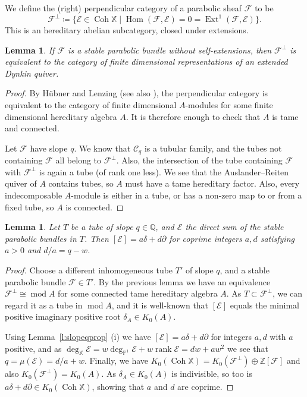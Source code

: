 \documentclass[12pt,a4paper]{amsart}
\theoremstyle{plain}
\newtheorem{lem}[thm]{Lemma}
\newcommand{\Q}{\mathbb Q}
\newcommand{\Z}{\mathbb Z}
\newcommand{\PP}{\mathbb P}
\DeclareMathOperator{\Coh}{Coh}
\DeclareMathOperator{\mmod}{mod}
\DeclareMathOperator{\Hom}{Hom}
\DeclareMathOperator{\Ext}{Ext}
\DeclareMathOperator{\rank}{rank}
\newcommand{\F}{\mathcal F}
\newcommand{\E}{\mathcal E}
\newcommand{\CC}{\mathcal C}
\newcommand{\XX}{\mathbb X}
\begin{document}
We define the (right) perpendicular category of a parabolic sheaf $\F$ to be
\[ \F^\perp \coloneqq \{\E\in\Coh\XX \mid \Hom(\F,\E) = 0 = \Ext^1(\F,\E)\}. \]
This is an hereditary abelian subcategory, closed under extensions.

\begin{lem}
\label{l:HubnerLenzing}
If $\F$ is a stable parabolic bundle without self-extensions, then $\F^\perp$ is equivalent to the category of finite dimensional representations of an extended Dynkin quiver.
\end{lem}

\begin{proof}
By H\"ubner and Lenzing \cite{HL} (see also \cite[Theorem 4.2]{CBcw}), the perpendicular category is equivalent to the category of finite dimensional $A$-modules for some finite dimensional hereditary algebra $A$. It is therefore enough to check that $A$ is tame and connected.

Let $\F$ have slope $q$. We know that $\CC_q$ is a tubular family, and the tubes not containing $\F$ all belong to $\F^\perp$. Also, the intersection of the tube containing $\F$ with $\F^\perp$ is again a tube (of rank one less). We see that the Auslander--Reiten quiver of $A$ contains tubes, so $A$ must have a tame hereditary factor. Also, every indecomposable $A$-module is either in a tube, or has a non-zero map to or from a fixed tube, so $A$ is connected.
\end{proof}

\begin{lem}
\label{l:slopeqclass}
Let $T$ be a tube of slope $q\in\Q$, and $\E$ the direct sum of the stable parabolic bundles in $T$. Then $[\E]=a\delta+d\partial$ for coprime integers $a,d$ satisfying $a>0$ and $d/a=q-w$.
\end{lem}

\begin{proof}
Choose a different inhomogeneous tube $T'$ of slope $q$, and a stable parabolic bundle $\F\in T'$. By the previous lemma we have an equivalence $\F^\perp\cong\mmod A$ for some connected tame hereditary algebra $A$. As $T\subset\F^\perp$, we can regard it as a tube in $\mmod A$, and it is well-known that $[\E]$ equals the minimal positive imaginary positive root $\delta_A\in K_0(A)$.

Using Lemma~\ref{l:slopeqprop} (i) we have $[\E]=a\delta+d\partial$ for integers $a,d$ with $a$ positive, and as $\deg_\XX\E=w\deg_{\PP^1}\E+w\rank\E=dw+aw^2$ we see that $q=\mu(\E)=d/a+w$. Finally, we have $K_0(\Coh\XX)=K_0(\F^\perp)\oplus\Z[\F]$ and also $K_0(\F^\perp)=K_0(A)$. As $\delta_A\in K_0(A)$ is indivisible, so too is $a\delta+d\partial\in K_0(\Coh\XX)$, showing that $a$ and $d$ are coprime.
\end{proof}
\end{document}
